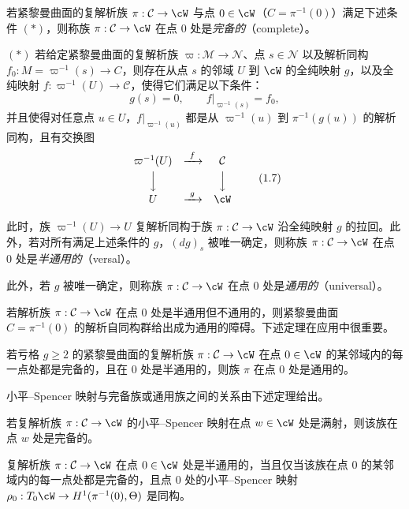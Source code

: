 \begin{definition}[1.5]
若紧黎曼曲面的复解析族 $\pi:\mathcal{C}\to\cW$ 与点 $0\in\cW$（$C=\pi^{-1}(0)$）满足下述条件 $(*)$，则称族 $\pi:\mathcal{C}\to\cW$ 在点 $0$ 处是\emph{完备的}（complete）。

$(*)$ 若给定紧黎曼曲面的复解析族 $\varpi:\mathcal{M}\to\mathcal{N}$、点 $s\in\mathcal{N}$ 以及解析同构 $f_0:M=\varpi^{-1}(s)\to C$，则存在从点 $s$ 的邻域 $U$ 到 $\cW$ 的全纯映射 $g$，以及全纯映射 $f:\varpi^{-1}(U)\to\mathcal{C}$，使得它们满足以下条件：
\[
g(s)=0,\qquad f|_{\varpi^{-1}(s)}=f_0,
\]
并且使得对任意点 $u\in U$，$f|_{\varpi^{-1}(u)}$ 都是从 $\varpi^{-1}(u)$ 到 $\pi^{-1}(g(u))$ 的解析同构，且有交换图
\begin{equation}
\begin{array}{ccc}
\varpi^{-1}(U) & \xrightarrow{\ f\ } & \mathcal{C}\\[1mm]
\Big\downarrow & & \Big\downarrow\\[1mm]
U & \xrightarrow{\ g\ } & \cW
\end{array} \tag{1.7}
\end{equation}

此时，族 $\varpi^{-1}(U)\to U$ 复解析同构于族 $\pi:\mathcal{C}\to\cW$ 沿全纯映射 $g$ 的拉回。此外，若对所有满足上述条件的 $g$，$(dg)_s$ 被唯一确定，则称族 $\pi:\mathcal{C}\to\cW$ 在点 $0$ 处是\emph{半通用的}（versal）。

此外，若 $g$ 被唯一确定，则称族 $\pi:\mathcal{C}\to\cW$ 在点 $0$ 处是\emph{通用的}（universal）。
\end{definition}

若解析族 $\pi:\mathcal{C}\to\cW$ 在点 $0$ 处是半通用但不通用的，则紧黎曼曲面 $C=\pi^{-1}(0)$ 的解析自同构群给出成为通用的障碍。下述定理在应用中很重要。

\begin{theorem}[1.6]
若亏格 $g\ge2$ 的紧黎曼曲面的复解析族 $\pi:\mathcal{C}\to\cW$ 在点 $0\in\cW$ 的某邻域内的每一点处都是完备的，且在 $0$ 处是半通用的，则族 $\pi$ 在点 $0$ 处是通用的。
\end{theorem}

小平–Spencer 映射与完备族或通用族之间的关系由下述定理给出。

\begin{theorem}[1.7]
若复解析族 $\pi:\mathcal{C}\to\cW$ 的小平–Spencer 映射在点 $w\in\cW$ 处是满射，则该族在点 $w$ 处是完备的。
\end{theorem}

\begin{theorem}[1.8]
复解析族 $\pi:\mathcal{C}\to\cW$ 在点 $0\in\cW$ 处是半通用的，当且仅当该族在点 $0$ 的某邻域内的每一点处都是完备的，且点 $0$ 处的小平–Spencer 映射 $\rho_0:T_0\cW\to H^1(\pi^{-1}(0),\Theta)$ 是同构。
\end{theorem}

